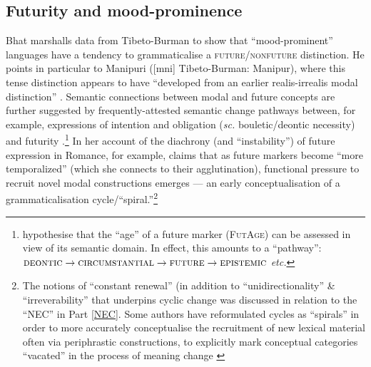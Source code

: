 \subsection{Futurity and mood-prominence}
Bhat marshalls data from Tibeto-Burman to show that ``mood-prominent'' languages have a tendency to grammaticalise a \textsc{future/nonfuture} distinction. He points in particular to Manipuri ([\gls{mni}] Tibeto-Burman: Manipur), where this tense distinction appears to have ``developed from an earlier realis-irrealis modal distinction'' \citeyearpar[19]{Bhat1999}. Semantic connections between modal and future concepts are further suggested by frequently-attested semantic change pathways between, for example, expressions of intention and obligation (\textit{sc.} bouletic/deontic necessity) and futurity \citep[and then to epistemic modality, \textit{e.g.},][]{Bybee1978,Bybee1991,Bybee1994,Kuteva2019}.\footnote{\citet*{Bybee1991} hypothesise that the ``age'' of a future marker (\textsc{FutAge}) can be assessed in view of its semantic domain. In effect, this amounts to a ``pathway'': $\textsc{deontic}\to\textsc{circumstantial}\to\textsc{future}\to\textsc{epistemic}$ \textit{etc.}} In her account of the diachrony (and ``instability'') of future expression in Romance, for example, \citet[31, 75, 106]{Fleischman1982} claims that as future markers become ``more temporalized'' (which she connects to their agglutination), functional pressure to recruit novel modal constructions emerges --- an early conceptualisation of a grammaticalisation cycle/``spiral.''\footnote{The notions of ``constant renewal'' (in addition to ``unidirectionality'' \& ``irreverability'' that underpins cyclic change was discussed in relation to the ``\acrlong{NEC}'' in Part \ref{NEC}. Some authors have reformulated cycles as ``spirals'' in order to more accurately conceptualise the recruitment of new lexical material often via periphrastic constructions, to explicitly mark conceptual categories ``vacated'' in the process of meaning change \citetext{\citealp{Haspelmath2000} attributes this metaphor to \citealt{VonGabalentz1901}.}}


